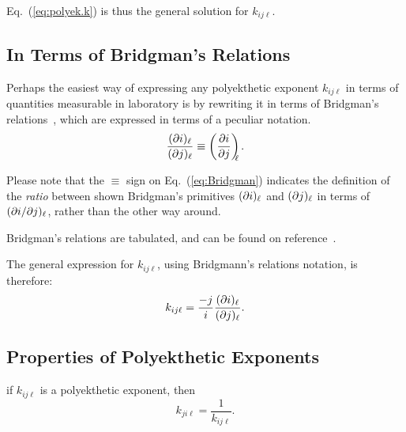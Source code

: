     Eq.~(\ref{eq:polyek.k}) is thus the general solution for $k_{ij\ell}$.

    \subsection{In Terms of Bridgman's Relations}

    Perhaps the easiest way of expressing any polyekthetic exponent  $k_{ij\ell}$  in  terms  of
    quantities  measurable  in  laboratory  is  by  rewriting  it   in   terms   of   Bridgman's
    relations~\cite{2006-BejanA-Wiley}, which are expressed in terms of a peculiar notation.
    \begin{equation}
        \frac{(\partial {{i}})_{{\ell}}}{(\partial {{j}})_{{\ell}}} \equiv \left(\frac{\partial {{i}}}{\partial {{j}}}\right)_{\!\!\!{\ell}}.
        \label{eq:Bridgman}
    \end{equation}

    Please note that the $\equiv$ sign on Eq.~(\ref{eq:Bridgman}) indicates  the  definition  of
    the \emph{ratio} between shown Bridgman's primitives $(\partial {{i}})_{{\ell}}$ and $(\partial {{j}})_{{\ell}}$ in  terms
    of $({\partial {{i}}}/{\partial {{j}}})_{{\ell}}$, rather than the other way around.

    Bridgman's relations are tabulated, and can be found on reference~\cite{2006-BejanA-Wiley}.

    The general expression for $k_{ij\ell}$, using Bridgmann's relations notation, is therefore:
    \begin{equation}
        k_{ij\ell} = \frac{-j}{i}\frac{(\partial {{i}})_{{\ell}}}{(\partial {{j}})_{{\ell}}}.
        \label{eq:k.bri}
    \end{equation}

    \subsection{Properties of Polyekthetic Exponents}

    \begin{theorem}\label{the:k.recip}
        if $k_{ij\ell}$ is a polyekthetic exponent, then
        \begin{equation}
            k_{ji\ell} = \frac{1}{k_{ij\ell}}.
            \label{eq:k.recipr}
        \end{equation}
    \end{theorem}


